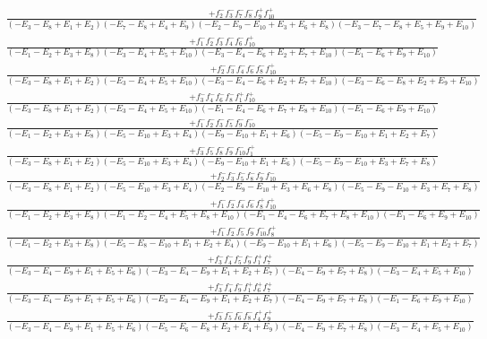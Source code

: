 \documentclass{article}
\begin{document}
\[\begin{array}{rcl}
\frac{+f_{2}^{-}f_{3}^{-}f_{7}^{-}f_{8}^{-}f_{9}^{+}f_{10}^{+}}{(-E_{3}-E_{8}+E_{1}+E_{2})(-E_{7}-E_{8}+E_{4}+E_{9})(-E_{2}-E_{9}-E_{10}+E_{3}+E_{6}+E_{8})(-E_{3}-E_{7}-E_{8}+E_{5}+E_{9}+E_{10})}\\
\frac{+f_{1}^{-}f_{2}^{-}f_{3}^{-}f_{4}^{-}f_{6}^{-}f_{10}^{+}}{(-E_{1}-E_{2}+E_{3}+E_{8})(-E_{3}-E_{4}+E_{5}+E_{10})(-E_{3}-E_{4}-E_{6}+E_{2}+E_{7}+E_{10})(-E_{1}-E_{6}+E_{9}+E_{10})}\\
\frac{+f_{2}^{-}f_{3}^{-}f_{4}^{-}f_{6}^{-}f_{8}^{-}f_{10}^{+}}{(-E_{3}-E_{8}+E_{1}+E_{2})(-E_{3}-E_{4}+E_{5}+E_{10})(-E_{3}-E_{4}-E_{6}+E_{2}+E_{7}+E_{10})(-E_{3}-E_{6}-E_{8}+E_{2}+E_{9}+E_{10})}\\
\frac{+f_{3}^{-}f_{4}^{-}f_{6}^{-}f_{8}^{-}f_{1}^{+}f_{10}^{+}}{(-E_{3}-E_{8}+E_{1}+E_{2})(-E_{3}-E_{4}+E_{5}+E_{10})(-E_{1}-E_{4}-E_{6}+E_{7}+E_{8}+E_{10})(-E_{1}-E_{6}+E_{9}+E_{10})}\\
\frac{+f_{1}^{-}f_{2}^{-}f_{3}^{-}f_{5}^{-}f_{9}^{-}f_{10}^{-}}{(-E_{1}-E_{2}+E_{3}+E_{8})(-E_{5}-E_{10}+E_{3}+E_{4})(-E_{9}-E_{10}+E_{1}+E_{6})(-E_{5}-E_{9}-E_{10}+E_{1}+E_{2}+E_{7})}\\
\frac{+f_{3}^{-}f_{5}^{-}f_{8}^{-}f_{9}^{-}f_{10}^{-}f_{1}^{+}}{(-E_{3}-E_{8}+E_{1}+E_{2})(-E_{5}-E_{10}+E_{3}+E_{4})(-E_{9}-E_{10}+E_{1}+E_{6})(-E_{5}-E_{9}-E_{10}+E_{3}+E_{7}+E_{8})}\\
\frac{+f_{2}^{-}f_{3}^{-}f_{5}^{-}f_{8}^{-}f_{9}^{-}f_{10}^{-}}{(-E_{3}-E_{8}+E_{1}+E_{2})(-E_{5}-E_{10}+E_{3}+E_{4})(-E_{2}-E_{9}-E_{10}+E_{3}+E_{6}+E_{8})(-E_{5}-E_{9}-E_{10}+E_{3}+E_{7}+E_{8})}\\
\frac{+f_{1}^{-}f_{2}^{-}f_{4}^{-}f_{6}^{-}f_{8}^{+}f_{10}^{+}}{(-E_{1}-E_{2}+E_{3}+E_{8})(-E_{1}-E_{2}-E_{4}+E_{5}+E_{8}+E_{10})(-E_{1}-E_{4}-E_{6}+E_{7}+E_{8}+E_{10})(-E_{1}-E_{6}+E_{9}+E_{10})}\\
\frac{+f_{1}^{-}f_{2}^{-}f_{5}^{-}f_{9}^{-}f_{10}^{-}f_{8}^{+}}{(-E_{1}-E_{2}+E_{3}+E_{8})(-E_{5}-E_{8}-E_{10}+E_{1}+E_{2}+E_{4})(-E_{9}-E_{10}+E_{1}+E_{6})(-E_{5}-E_{9}-E_{10}+E_{1}+E_{2}+E_{7})}\\
\frac{+f_{3}^{-}f_{4}^{-}f_{5}^{-}f_{9}^{-}f_{1}^{+}f_{7}^{+}}{(-E_{3}-E_{4}-E_{9}+E_{1}+E_{5}+E_{6})(-E_{3}-E_{4}-E_{9}+E_{1}+E_{2}+E_{7})(-E_{4}-E_{9}+E_{7}+E_{8})(-E_{3}-E_{4}+E_{5}+E_{10})}\\
\frac{+f_{3}^{-}f_{4}^{-}f_{9}^{-}f_{1}^{+}f_{6}^{+}f_{7}^{+}}{(-E_{3}-E_{4}-E_{9}+E_{1}+E_{5}+E_{6})(-E_{3}-E_{4}-E_{9}+E_{1}+E_{2}+E_{7})(-E_{4}-E_{9}+E_{7}+E_{8})(-E_{1}-E_{6}+E_{9}+E_{10})}\\
\frac{+f_{3}^{-}f_{5}^{-}f_{6}^{-}f_{8}^{-}f_{4}^{+}f_{9}^{+}}{(-E_{3}-E_{4}-E_{9}+E_{1}+E_{5}+E_{6})(-E_{5}-E_{6}-E_{8}+E_{2}+E_{4}+E_{9})(-E_{4}-E_{9}+E_{7}+E_{8})(-E_{3}-E_{4}+E_{5}+E_{10})}\\

\end{array}\]
\end{document}
